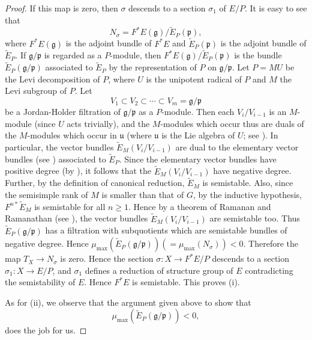 \documentclass[12pt]{article}
\begin{document}
\begin{proof}
If this map is zero, then $\sigma$ descends to a section $\sigma_1$ of $E/P$. It is easy to see that
\[
N_\sigma = F^*E(\mathfrak{g})/\widetilde{E}_P(\mathfrak{p}),
\]
where $F^*E(\mathfrak{g})$ is the adjoint bundle of $F^*E$ and $\widetilde{E}_P(\mathfrak{p})$ is the adjoint bundle of $\widetilde{E}_P$. If $\mathfrak{g}/\mathfrak{p}$ is regarded as a $P$-module, then $F^*E(\mathfrak{g})/\widetilde{E}_P(\mathfrak{p})$ is the bundle $\widetilde{E}_P(\mathfrak{g}/\mathfrak{p})$ associated to $\widetilde{E}_P$ by the representation of $P$ on $\mathfrak{g}/\mathfrak{p}$. Let $P = MU$ be the Levi decomposition of $P$, where $U$ is the unipotent radical of $P$ and $M$ the Levi subgroup of $P$. Let
\[
V_1 \subset V_2 \subset \cdots \subset V_m = \mathfrak{g}/\mathfrak{p}
\]
be a Jordan-Holder filtration of $\mathfrak{g}/\mathfrak{p}$ as a $P$-module. Then each $V_i / V_{i-1}$ is an $M$-module (since $U$ acts trivially), and the $M$-modules which occur thus are duals of the $M$-modules which occur in $\mathfrak{u}$ (where $\mathfrak{u}$ is the Lie algebra of $U$; see \cite[Remark 6, Section 3]{azad-barry-seitz}). In particular, the vector bundles $\widetilde{E}_M(V_i / V_{i-1})$ are dual to the elementary vector bundles (see \cite{behrend}) associated to $\widetilde{E}_P$. Since the elementary vector bundles have positive degree (by \cite{behrend}), it follows that the $\widetilde{E}_M(V_i / V_{i-1})$ have negative degree. Further, by the definition of canonical reduction, $\widetilde{E}_M$ is semistable. Also, since the semisimple rank of $M$ is smaller than that of $G$, by the inductive hypothesis, $F^{n*}\widetilde{E}_M$ is semistable for all $n \geq 1$. Hence by a theorem of Ramanan and Ramanathan (see \cite[Theorem 3.23]{ramanan-ramanathan}), the vector bundles $\widetilde{E}_M(V_i / V_{i-1})$ are semistable too. Thus $\widetilde{E}_P(\mathfrak{g}/\mathfrak{p})$ has a filtration with subquotients which are semistable bundles of negative degree. Hence
$
\mu_{\max}(\widetilde{E}_P(\mathfrak{g}/\mathfrak{p})) (= \mu_{\max}(N_\sigma)) < 0.
$
Therefore the map $T_X \to N_\sigma$ is zero. Hence the section $\sigma : X \to F^*E/P$ descends to a section $\sigma_1 : X \to E/P$, and $\sigma_1$ defines a reduction of structure group of $E$ contradicting the semistability of $E$. Hence $F^*E$ is semistable. This proves (i).

As for (ii), we observe that the argument given above to show that
\[
\mu_{\max}(\widetilde{E}_P(\mathfrak{g}/\mathfrak{p})) < 0,
\]
does the job for us.


\end{proof}
\end{document}
